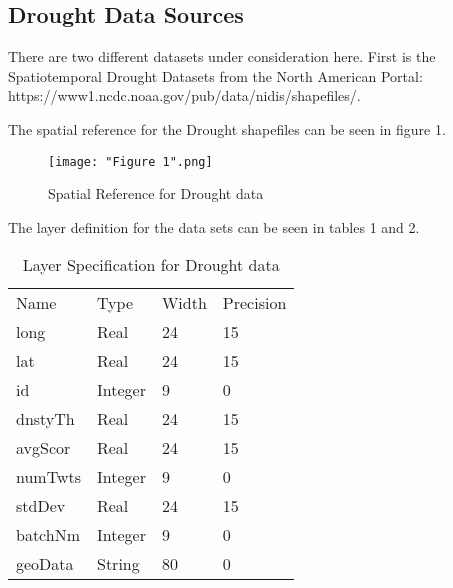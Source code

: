 \documentclass[conference]{IEEEtran}
\begin{document}
\subsection{Drought Data Sources}

There are two different datasets under consideration here. First is the Spatiotemporal Drought Datasets from the North American Portal: https://www1.ncdc.noaa.gov/pub/data/nidis/shapefiles/.



The spatial reference for the Drought shapefiles can be seen in figure 1.  

\begin{figure}[ht]
\centerline{\texttt{[image: "Figure 1".png]}}
\caption{Spatial Reference for Drought data}
\label{Figure 1}
\end{figure}



The layer definition for the data sets can be seen in tables 1 and 2.

\begin{table}[]
\caption{Layer Specification for Drought data}
\label{Table 1}
\centering
\begin{tabular}{llll}
Name    & Type    & Width & Precision \\
long    & Real    & 24    & 15        \\
lat     & Real    & 24    & 15        \\
id      & Integer & 9     & 0         \\
dnstyTh & Real    & 24    & 15        \\
avgScor & Real    & 24    & 15        \\
numTwts & Integer & 9     & 0         \\
stdDev  & Real    & 24    & 15        \\
batchNm & Integer & 9     & 0         \\
geoData & String  & 80    & 0        
\end{tabular}
\end{table}
\end{document}
